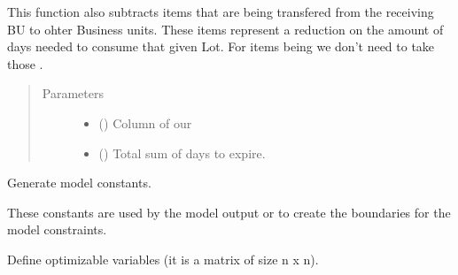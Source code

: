 \documentclass[letterpaper,10pt,english]{sphinxmanual}
\begin{document}
\begin{fulllineitems}
\begin{fulllineitems}
This function also subtracts items that are being transfered from the receiving BU to ohter Business units.
These items represent a reduction on the amount of days needed to consume that given Lot.
For items being  we don’t need to take those .
\begin{quote}\begin{description}
\item[{Parameters}] \leavevmode\begin{itemize}
\item {} 
 () \textendash{} Column of our 

\item {} 
 () \textendash{} Total sum of days to expire.

\end{itemize}

\end{description}\end{quote}

\end{fulllineitems}


\begin{fulllineitems}
\label{\detokenize{source/optimization.model:optimization.model.optimizer.OptimizationModel._create_constants}}
Generate model constants.

These constants are used by the model output or to create the boundaries for the model constraints.

\end{fulllineitems}


\begin{fulllineitems}
\label{\detokenize{source/optimization.model:optimization.model.optimizer.OptimizationModel._create_decision_variables}}
Define optimizable variables (it is a matrix of size n x n).


\end{fulllineitems}
\end{fulllineitems}
\end{document}
